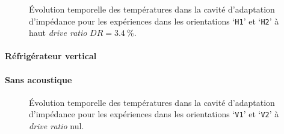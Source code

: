\begin{figure}[!ht]
    \centering
    
    \caption{\'Evolution temporelle des températures dans la cavité d'adaptation d'impédance pour les expériences dans les orientations `\texttt{H1}' et `\texttt{H2}' à haut \textit{drive ratio} $DR=\qty{3.4}{\percent}$.}
    \label{fig:Acou_CHXout_H1H2_High}
\end{figure}


\paragraph{Réfrigérateur vertical}
\paragraph*{Sans acoustique}

\begin{figure}[!ht]
    \centering
    
    \caption{\'Evolution temporelle des températures dans la cavité d'adaptation d'impédance pour les expériences dans les orientations `\texttt{V1}' et `\texttt{V2}' à \textit{drive ratio} nul.}
    \label{fig:HeatOnly_CHXout_V1V2}
\end{figure}

